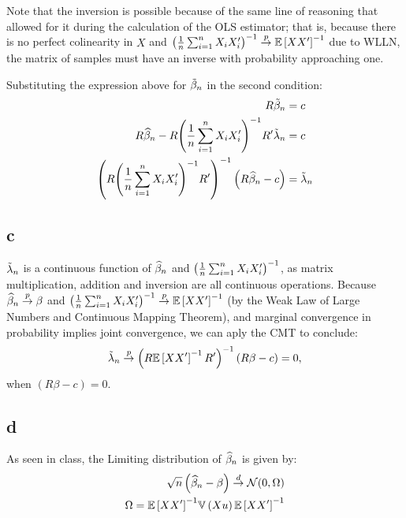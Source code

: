 \documentclass[12pt]{paper}
\begin{document}
Note that the inversion is possible because of the same line of
reasoning that allowed for it during the calculation of the OLS
estimator; that is, because there is no perfect colinearity in $X$ and ${\left( \frac{1}{n} \sum_{i=1}^n X_i X_i'  \right)}^{-1}\overset{p}{\to}\mathbb{E} \left [ XX' \right ]^{-1}$ due to WLLN, the matrix of samples must have an inverse with probability approaching one.

Substituting the expression above for $\tilde{ \beta }_{n}$ in the second condition:
\begin{align*}
  R \tilde{ \beta }_{n} &= c\\
  R \widehat{ \beta }_{n} - R {\left( \frac{1}{n} \sum_{i=1}^n X_i X_i'  \right)}^{-1}
  R' \tilde{ \lambda }_{n} &= c\\
   { \left( R { \left( \frac{1}{n} \sum_{i=1}^n X_i
               X_i' \right)}^{-1} R' \right)}^{-1} \left(  R \widehat{ \beta }_{n} - c \right)
               &= \tilde{ \lambda }_{n}
\end{align*}


\subsection*{c}

$\tilde{ \lambda }_{n}$ is a continuous function of
$\widehat{ \beta }_{n}$ and ${\left( \frac{1}{n} \sum_{i=1}^n X_i X_i'  \right)}^{-1}$, as matrix multiplication, addition and inversion are all
continuous operations. Because $\widehat{ \beta }_{n} \overset{p}{\to} \beta$ and ${\left( \frac{1}{n} \sum_{i=1}^n X_i X_i'  \right)}^{-1}\overset{p}{\to}\mathbb{E} \left [ XX' \right ]^{-1}$ (by the
Weak Law of Large Numbers and Continuous Mapping Theorem), and marginal convergence in probability implies joint convergence, we can aply the CMT to conclude:
\begin{equation*}
  \tilde{ \lambda }_{n} \overset{p}{\to} { \left( R\mathbb{E} \left [ XX' \right ]^{-1}R' \right)}^{-1} \left(  R \beta - c \right) = 0,
\end{equation*}
when $\left(  R \beta - c \right) = 0$.

\subsection*{d}

As seen in class, the Limiting distribution of $\widehat{ \beta }_{n}$ is given by:
\begin{align*}
  \sqrt{n} \left(  \widehat{ \beta }_{n} - \beta \right) \overset{d}{\to} \mathcal{N}( 0, \Omega)\\
  \Omega = {\mathbb{E} \left [ XX' \right ]}^{-1} \mathbb{V} \left ( X u \right ) {\mathbb{E} \left [ XX' \right ]}^{-1}\\
\end{align*}
\end{document}

